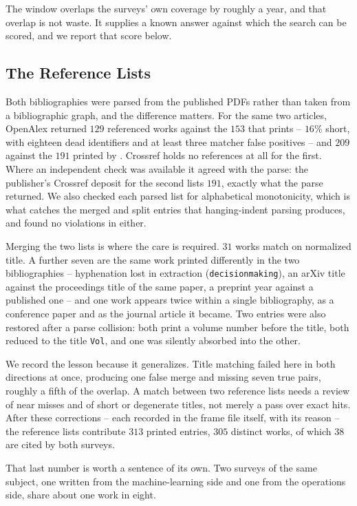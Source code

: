 The window overlaps the surveys' own coverage by roughly a year, and that overlap is not waste. It
supplies a known answer against which the search can be scored, and we report that score below.

\subsection{The Reference Lists}

Both bibliographies were parsed from the published PDFs rather than taken from a bibliographic
graph, and the difference matters. For the same two articles, OpenAlex returned \(129\) referenced
works against the \(153\) that \citet{mandi2024decision} prints -- \(16\%\) short, with eighteen dead
identifiers and at least three matcher false positives -- and \(209\) against the \(191\) printed by
\citet{sadana2025survey}. Crossref holds no references at all for the first. Where an independent
check was available it agreed with the parse: the publisher's Crossref deposit for the second lists
\(191\), exactly what the parse returned. We also checked each parsed list for alphabetical
monotonicity, which is what catches the merged and split entries that hanging-indent parsing
produces, and found no violations in either.

Merging the two lists is where the care is required. \(31\) works match on normalized title. A
further seven are the same work printed differently in the two bibliographies -- hyphenation lost in
extraction (\texttt{decisionmaking}), an arXiv title against the proceedings title of the same
paper, a preprint year against a published one -- and one work appears twice within a single
bibliography, as a conference paper and as the journal article it became. Two entries were also
restored after a parse collision: both print a volume number before the title, both reduced to the
title \texttt{Vol}, and one was silently absorbed into the other.

We record the lesson because it generalizes. Title matching failed here in both directions at once,
producing one false merge and missing seven true pairs, roughly a fifth of the overlap. A match
between two reference lists needs a review of near misses and of short or degenerate titles, not
merely a pass over exact hits. After these corrections -- each recorded in the frame file itself,
with its reason -- the reference lists contribute \(313\) printed entries, \(305\) distinct works,
of which \(38\) are cited by both surveys.

That last number is worth a sentence of its own. Two surveys of the same subject, one written from
the machine-learning side and one from the operations side, share about one work in eight.

